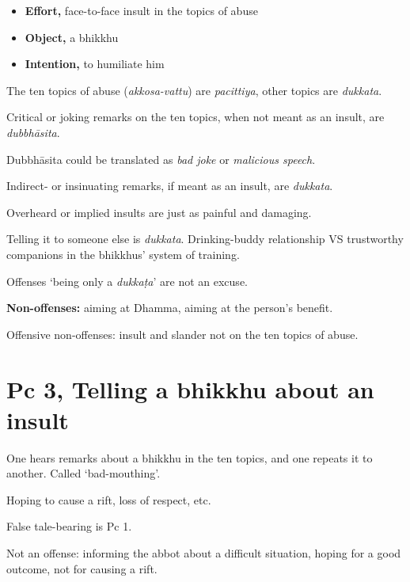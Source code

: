 \begin{multicols}{2}

\begin{itemize}
\tightlist
\item
  \textbf{Effort,} face-to-face insult in the topics of abuse
\item
  \textbf{Object,} a bhikkhu
\item
  \textbf{Intention,} to humiliate him
\end{itemize}

The ten topics of abuse (\emph{akkosa-vattu}) are \emph{pacittiya},
other topics are \emph{dukkata}.

Critical or joking remarks on the ten topics, when not meant as an
insult, are \emph{dubbhāsita}.

Dubbhāsita could be translated as \emph{bad joke} or \emph{malicious
speech}.

\columnbreak

Indirect- or insinuating remarks, if meant as an insult, are
\emph{dukkata}.

Overheard or implied insults are just as painful and damaging.

Telling it to someone else is \emph{dukkata}. Drinking-buddy
relationship VS trustworthy companions in the bhikkhus' system of
training.

Offenses `being only a \emph{dukkaṭa}' are not an excuse.


\textbf{Non-offenses:} aiming at Dhamma, aiming at the person's benefit.

Offensive non-offenses: insult and slander not on the ten topics of
abuse.

\end{multicols}

\section{Pc 3, Telling a bhikkhu about an insult}

One hears remarks about a bhikkhu in the ten topics, and one repeats it
to another. Called `bad-mouthing'.

Hoping to cause a rift, loss of respect, etc.

False tale-bearing is Pc 1.

Not an offense: informing the abbot about a difficult situation, hoping
for a good outcome, not for causing a rift.

